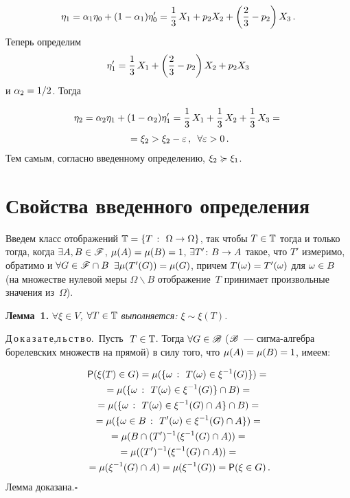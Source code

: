 \begin{multicols}{2}
\noindent
$$
\eta_1 = \alpha_1 \eta_0 + (1 - \alpha_1) \eta_0' 
= \displaystyle\frac{\displaystyle 1\mathstrut}{\displaystyle 3\mathstrut}\, X_1 + p_2 X_2 + \left(\displaystyle\frac{\displaystyle 2\mathstrut}{\displaystyle 3\mathstrut}- p_2\right) X_3\,.
$$ 
Теперь определим 
$$
\eta_1' = \displaystyle\frac{\displaystyle 1\mathstrut}{\displaystyle 3\mathstrut}\, X_1 + \left(\displaystyle\frac{\displaystyle 2\mathstrut}{\displaystyle 3\mathstrut}- p_2\right) X_2 + p_2 X_3
$$ и
$\alpha_2 \hm= 1/2 $. 
Тогда 



\noindent
\begin{multline*}
\eta_2 = \alpha_2 \eta_1 + (1 - \alpha_2) \eta_1' = 
\fr{1}{3}\, X_1 + \fr{1}{3}\, X_2 + \fr{1}{3}\, X_3 ={}\\
{}=
    \xi_2 > \xi_2 - \eps\,,\enskip \forall \eps\hm>0\,.
    \end{multline*} 
    Тем самым, согласно введенному определению, $\xi_2 \succcurlyeq \xi_1$.

\vspace*{-3pt}

\section{Свойства введенного определения}

\vspace*{-1pt}

Введем класс отображений $ \classT \hm= \Set {T}{\Omega \rightarrow
\Omega} $, так чтобы $T \hm\in \classT $ тогда и только тогда, когда
$\exists A,B \hm\in \sigmaF$, $\mu(A)\hm=\mu(B)=1$, $\exists T' \colon B
\hm\rightarrow A$ такое, что $T'$ измеримо, обратимо и $\forall
G\hm\in\sigmaF\cap B$ $\exists \mu(T'(G)) \hm= \mu(G)$, причем
$T(\omega)\hm=T'(\omega)$  для  $\omega \hm\in B$ (на множестве
нулевой меры $\Omega \backslash B$ отображение~$T$ принимает
произвольные значения из~$\Omega$).

\medskip

\noindent
\textbf{Лемма~1.} \textit{$\forall \xi \in V $, $\forall T \in \mathbb {T} $
выполняется: $\xi \sim \xi(T) $.} 

\smallskip

\noindent
Д\,о\,к\,а\,з\,а\,т\,е,л\,ь\,с\,т\,в\,о.\  
Пусть $\ T \hm\in \classT$.
Тогда $\forall G \hm\in \sigmaB$ ($\mathscr{B}$~--- сиг\-ма-ал\-геб\-ра
борелевских множеств на прямой) в силу того, что
$\mu(A)\hm=\mu(B)\hm=1$, имеем:

\noindent
\begin{multline*}
{\sf P}(\xi(T) \in G) = \mu( \{{\omega\ \colon\ T(\omega) \in \xi^{-1}(G) \}} ) = {}\\
{}=\mu(\{{\omega\ \colon\ T(\omega) \in \xi^{-1}(G) \}} \cap B)={} \\
{}=\mu(\{{\omega\ \colon\ T(\omega) \in \xi^{-1}(G)\cap A \}} \cap B)={} \\
{}=\mu(\{{\omega \in B\ \colon\ T'(\omega) \in \xi^{-1}(G)\cap A \}})={} \\
{}=\mu(B\cap (T')^{-1}(\xi^{-1}(G)\cap A))={}\\
{}= \mu((T')^{-1}(\xi^{-1}(G)\cap A))={}\\
{}= \mu(\xi^{-1}(G)\cap A)= \mu(\xi^{-1}(G)) = {\sf P}(\xi \in G)\,.
\end{multline*}
Лемма доказана.\hfill$\square$


\end{multicols}
